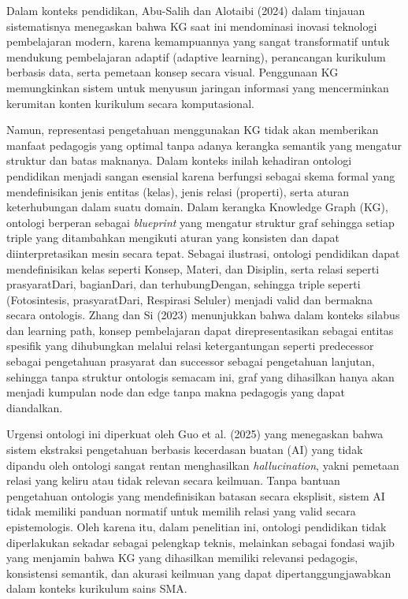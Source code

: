 \documentclass[
]{article}
\begin{document}
Dalam konteks pendidikan, Abu-Salih dan Alotaibi (2024) dalam tinjauan
sistematisnya menegaskan bahwa KG saat ini mendominasi inovasi teknologi
pembelajaran modern, karena kemampuannya yang sangat transformatif untuk
mendukung pembelajaran adaptif (adaptive learning), perancangan
kurikulum berbasis data, serta pemetaan konsep secara visual. Penggunaan
KG memungkinkan sistem untuk menyusun jaringan informasi yang
mencerminkan kerumitan konten kurikulum secara komputasional.

Namun, representasi pengetahuan menggunakan KG tidak akan memberikan
manfaat pedagogis yang optimal tanpa adanya kerangka semantik yang
mengatur struktur dan batas maknanya. Dalam konteks inilah kehadiran
ontologi pendidikan menjadi sangan esensial karena berfungsi sebagai
skema formal yang mendefinisikan jenis entitas (kelas), jenis relasi
(properti), serta aturan keterhubungan dalam suatu domain. Dalam
kerangka Knowledge Graph (KG), ontologi berperan sebagai
\emph{blueprint} yang mengatur struktur graf sehingga setiap triple yang
ditambahkan mengikuti aturan yang konsisten dan dapat diinterpretasikan
mesin secara tepat. Sebagai ilustrasi, ontologi pendidikan dapat
mendefinisikan kelas seperti Konsep, Materi, dan Disiplin, serta relasi
seperti prasyaratDari, bagianDari, dan terhubungDengan, sehingga triple
seperti (Fotosintesis, prasyaratDari, Respirasi Seluler) menjadi valid
dan bermakna secara ontologis. Zhang dan Si (2023) menunjukkan bahwa
dalam konteks silabus dan learning path, konsep pembelajaran dapat
direpresentasikan sebagai entitas spesifik yang dihubungkan melalui
relasi ketergantungan seperti predecessor sebagai pengetahuan prasyarat
dan successor sebagai pengetahuan lanjutan, sehingga tanpa struktur
ontologis semacam ini, graf yang dihasilkan hanya akan menjadi kumpulan
node dan edge tanpa makna pedagogis yang dapat diandalkan.

Urgensi ontologi ini diperkuat oleh Guo et al. (2025) yang menegaskan
bahwa sistem ekstraksi pengetahuan berbasis kecerdasan buatan (AI) yang
tidak dipandu oleh ontologi sangat rentan menghasilkan
\emph{hallucination}, yakni pemetaan relasi yang keliru atau tidak
relevan secara keilmuan. Tanpa bantuan pengetahuan ontologis yang
mendefinisikan batasan secara eksplisit, sistem AI tidak memiliki
panduan normatif untuk memilih relasi yang valid secara epistemologis.
Oleh karena itu, dalam penelitian ini, ontologi pendidikan tidak
diperlakukan sekadar sebagai pelengkap teknis, melainkan sebagai fondasi
wajib yang menjamin bahwa KG yang dihasilkan memiliki relevansi
pedagogis, konsistensi semantik, dan akurasi keilmuan yang dapat
dipertanggungjawabkan dalam konteks kurikulum sains SMA.
\end{document}
